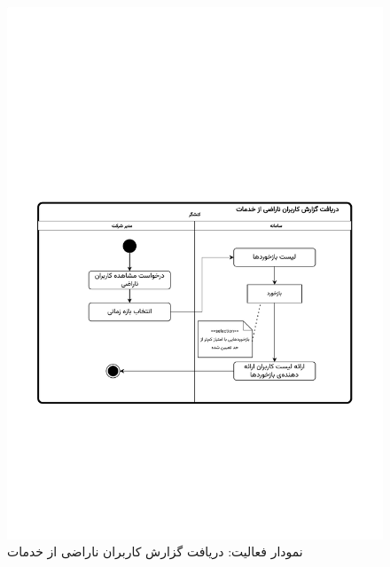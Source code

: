 \begin{figure}[ht!]
	\centering
	\includegraphics[scale=0.8, page=1]{figs/OOD-activity-angry.pdf}
	\caption{نمودار فعالیت: دریافت گزارش کاربران ناراضی از خدمات}
\end{figure}
\FloatBarrier
\newpage


